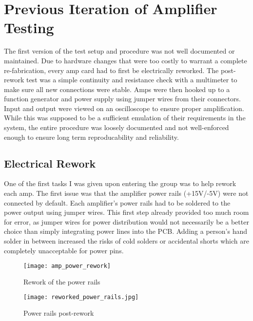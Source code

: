 %
%
\chapter{Previous Iteration of Amplifier Testing}
The first version of the test setup and procedure was not well documented or maintained. Due to hardware changes that were too costly to warrant a complete re-fabrication, every amp card had to first be electrically reworked. The post-rework test was a simple continuity and resistance check with a multimeter to make sure all new connections were stable. Amps were then hooked up to a function generator and power supply using jumper wires from their connectors. Input and output were viewed on an oscilloscope to ensure proper amplification. While this was supposed to be a sufficient emulation of their requirements in the system, the entire procedure was loosely documented and not well-enforced enough to ensure long term reproducability and reliability.
\section{Electrical Rework}
One of the first tasks I was given upon entering the group was to help rework each amp. The first issue was that the amplifier power rails (+15V/-5V) were not connected by default. Each amplifier's power rails had to be soldered to the power output using jumper wires. This first step already provided too much room for error, as jumper wires for power distribution would not necessarily be a better choice than simply integrating power lines into the PCB. Adding a person's hand solder in between increased the risks of cold solders or accidental shorts which are completely unacceptable for power pins. \par
\begin{figure}[!htb]
	\texttt{[image: amp\_power\_rework]}
	\centering
	\caption{Rework of the power rails}
	\centering
	\texttt{[image: reworked\_power\_rails.jpg]}
	\centering
	\caption{Power rails post-rework}
\end{figure}
